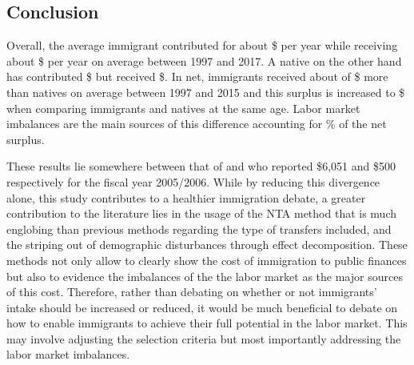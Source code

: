 \subsection{Conclusion}

Overall, the average immigrant contributed for about \$ per year while receiving about \$ per year on average between 1997 and 2017.
A native on the other hand has contributed \$ but received \$.
In net, immigrants received about of \$ more than natives on average between 1997 and 2015 and this surplus is increased to \$ when comparing immigrants and natives at the same age.
Labor market imbalances are the main sources of this difference accounting for \% of the net surplus.

\vspace{0.7em}\par
These results lie somewhere between that of \citet{Grubel:2012wo} and \citet{Javdani:2013gu} who reported \$6,051 and \$500 respectively for the fiscal year 2005/2006.
While by reducing this divergence alone, this study contributes to a healthier immigration debate, a greater contribution to the literature lies in the usage of the NTA method that is much englobing than previous methods regarding the type of transfers included, and the striping out of demographic disturbances through effect decomposition. These methods not only allow to clearly show the cost of immigration to public finances but also to evidence the imbalances of the the labor market as the major sources of this cost.
Therefore, rather than debating on whether or not immigrants' intake should be increased or reduced, it would be much beneficial to debate on how to enable immigrants to achieve their full potential in the labor market.
This may involve adjusting the selection criteria but most importantly addressing the labor market imbalances.

